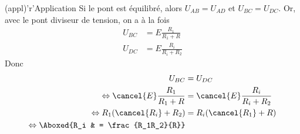 \documentclass[../TDE1-E2.tex]{subfiles}%
\begin{document}
{\begin{tcbraster}[raster columns=6, raster equal height=rows]
\begin{tcolorbox}[blankest, raster multicolumn=1, space to=\myspace]
\begin{tcbraster}[raster columns=1]
\begin{tcn}
            \end{tcn}
        \end{tcbraster}
    \end{tcolorbox}
    \begin{tcn}[raster multicolumn=3](appl)'r'{Application}
        Si le pont est équilibré, alors $U_{AB} = U_{AD}$ et $U_{BC} = U_{DC}$.
        Or, avec le pont diviseur de tension, on a à la fois
        \begin{align*}
            U_{BC} & = E \frac{R_1}{R_1+R}\\
            U_{DC} & = E \frac{R_i}{R_i+R_2}
        \end{align*}
        Donc
        \begin{align*}
            U_{BC} &= U_{DC}\\
            \Leftrightarrow \cancel{E} \frac{R_1}{R_1+R}
                   & = \cancel{E} \frac{R_i}{R_i+R_2}\\
            \Leftrightarrow R_1(\cancel{R_i}+R_2) & = R_i(\cancel{R_1}+R)\\
            \Leftrightarrow \Aboxed{R_i & = \frac{R_1R_2}{R}}
        \end{align*}
    \end{tcn}
\end{tcbraster}
}%
\end{document}
